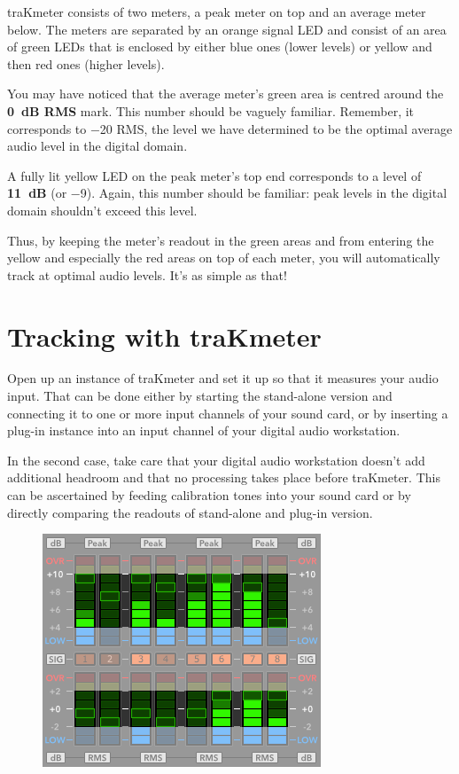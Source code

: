 traKmeter consists of two meters, a peak meter on top and an average
meter below.  The meters are separated by an orange signal LED and
consist of an area of green LEDs that is enclosed by either blue ones
(lower levels) or yellow and then red ones (higher levels).

You may have noticed that the average meter's green area is centred
around the \textbf{\SI{0}{\dB} RMS} mark.  This number should be
vaguely familiar.  Remember, it corresponds to \SI{-20}{\dBFS} RMS,
the level we have determined to be the optimal average audio level in
the digital domain.

A fully lit yellow LED on the peak meter's top end corresponds to a
level of \textbf{\SI[addsign=all]{+11}{\dB}} (or \SI{-9}{\dBFS}).
Again, this number should be familiar: peak levels in the digital
domain shouldn't exceed this level.

Thus, by keeping the meter's readout in the green areas and from
entering the yellow and especially the red areas on top of each meter,
you will automatically track at optimal audio levels.  It's as simple
as that!

\section{Tracking with traKmeter}
\label{sec:tracking_with_trakmeter}

Open up an instance of traKmeter and set it up so that it measures
your audio input.  That can be done either by starting the stand-alone
version and connecting it to one or more input channels of your sound
card, or by inserting a plug-in instance into an input channel of your
digital audio workstation.

In the second case, take care that your digital audio workstation
doesn't add additional headroom and that no processing takes place
before traKmeter.  This can be ascertained by feeding calibration
tones into your sound card or by directly comparing the readouts of
stand-alone and plug-in version.

\begin{figure}
\includegraphics[scale=0.45,clip]{include/images/trakmeter_optimal.png}
\end{figure}

